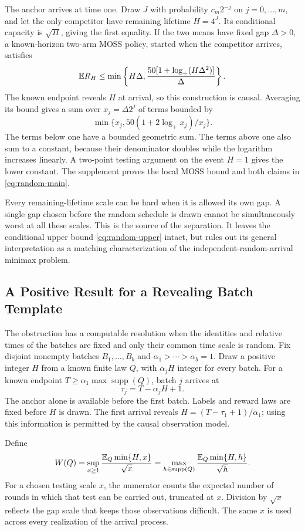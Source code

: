 The anchor arrives at time one. Draw $J$ with probability $c_m2^{-j}$ on $j=0,\ldots,m$, and let the only competitor have remaining lifetime $H=4^J$. Its conditional capacity is $\sqrt H$, giving the first equality. If the two means have fixed gap $\Delta>0$, a known-horizon two-arm MOSS policy, started when the competitor arrives, satisfies
\[
 \mathbb E R_H\le\min\left\{H\Delta,
 \frac{50[1+\log_+(H\Delta^2)]}{\Delta}\right\}.
\]
The known endpoint reveals $H$ at arrival, so this construction is causal. Averaging its bound gives a sum over $x_j=\Delta2^j$ of terms bounded by
\[
 \min\{x_j,50(1+2\log_+x_j)/x_j\}.
\]
The terms below one have a bounded geometric sum. The terms above one also sum to a constant, because their denominator doubles while the logarithm increases linearly. A two-point testing argument on the event $H=1$ gives the lower constant. The supplement proves the local MOSS bound and both claims in \eqref{eq:random-main}.

Every remaining-lifetime scale can be hard when it is allowed its own gap. A single gap chosen before the random schedule is drawn cannot be simultaneously worst at all these scales. This is the source of the separation. It leaves the conditional upper bound \eqref{eq:random-upper} intact, but rules out its general interpretation as a matching characterization of the independent-random-arrival minimax problem.

\subsection{A Positive Result for a Revealing Batch Template}
The obstruction has a computable resolution when the identities and
relative times of the batches are fixed and only their common time
scale is random. Fix disjoint nonempty batches $B_1,\ldots,B_b$ and
$\alpha_1>\cdots>\alpha_b=1$. Draw a positive integer $H$ from a known
finite law $Q$, with $\alpha_jH$ integer for every batch. For a known
endpoint $T\ge\alpha_1\max\operatorname{supp}(Q)$, batch $j$ arrives at
\[
 \tau_j=T-\alpha_jH+1.
\]
The anchor alone is available before the first batch. Labels and
reward laws are fixed before $H$ is drawn. The first arrival reveals
$H=(T-\tau_1+1)/\alpha_1$; using this information is permitted by the
causal observation model.

Define
\begin{equation}\label{eq:random-W-main}
 W(Q)=\sup_{x\ge1}\frac{\mathbb E_Q\min\{H,x\}}{\sqrt x}
 =\max_{h\in\operatorname{supp}(Q)}
       \frac{\mathbb E_Q\min\{H,h\}}{\sqrt h}.
\end{equation}
For a chosen testing scale $x$, the numerator counts the expected
number of rounds in which that test can be carried out, truncated at
$x$. Division by $\sqrt x$ reflects the gap scale that keeps those
observations difficult. The same $x$ is used across every realization
of the arrival process.

